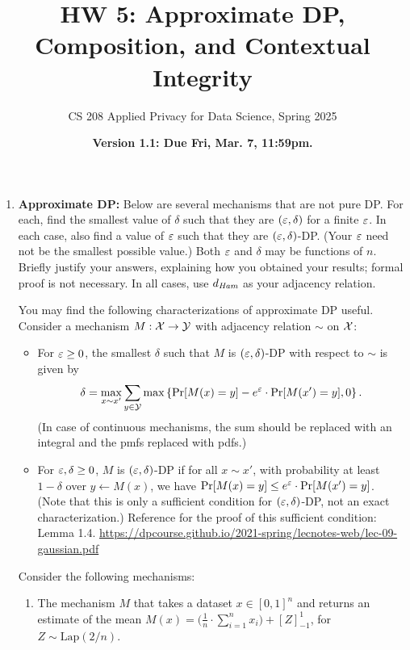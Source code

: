 \documentclass[11pt]{article}
\title{\vspace{-1.5cm} HW 5: Approximate DP, Composition, and Contextual Integrity}
\author{CS 208 Applied Privacy for Data Science, Spring 2025}
\date{\textbf{Version 1.1: Due Fri, Mar. 7, 11:59pm.}}
\begin{document}
\maketitle

\instructions

\begin{enumerate}[leftmargin=*]

\item \textbf{Approximate DP:}  
Below are several mechanisms that are not pure DP.  For each, find the smallest value of $\delta$ such that they are $(\varepsilon,\delta)$ for a finite $\varepsilon$.  In each case, also find a value of $\varepsilon$ such that they are $(\varepsilon,\delta)$-DP.  (Your $\varepsilon$ need not be the smallest possible value.)  Both $\varepsilon$ and $\delta$ may be functions of $n$.
Briefly justify your answers, explaining how you obtained your results; formal proof is not necessary.  In all cases, use $d_{\textit{Ham}}$ as your adjacency relation. 

You may find the following characterizations of approximate DP useful. Consider a mechanism $M : \mathcal{X}\rightarrow \mathcal{Y}$ with adjacency relation $\sim$ on $\mathcal{X}$:
\begin{itemize}
\item For $\varepsilon\geq 0$, the smallest $\delta$ such that $M$ is $(\varepsilon,\delta)$-DP with respect to $\sim$ is given by
$$\delta = \max_{x\sim x'} \sum_{y\in \mathcal{Y}} \max\left\{\Pr[M(x)=y]-e^\varepsilon\cdot \Pr[M(x')=y],0\right\}.$$
(In case of continuous mechanisms, the sum should be replaced with an integral and the pmfs replaced with pdfs.)

\item For $\varepsilon,\delta\geq 0$, $M$ is $(\varepsilon,\delta)$-DP if for all $x\sim x'$, with probability at least $1-\delta$ over $y\gets M(x)$, we have 
$\Pr[M(x)=y]\leq e^\varepsilon \cdot \Pr[M(x')=y]$.  (Note that this is only a sufficient condition for $(\varepsilon,\delta)$-DP, not an exact characterization.) Reference for the proof of this sufficient condition: Lemma 1.4. \url{https://dpcourse.github.io/2021-spring/lecnotes-web/lec-09-gaussian.pdf}
\end{itemize}


\enlargethispage{2\baselineskip}
Consider the following mechanisms:

\begin{enumerate} %
    \item  The mechanism $M$ that takes a dataset $x\in [0,1]^n$ and returns an estimate of the mean $M(x) = \Big(\frac{1}{n}\cdot \sum_{i=1}^n x_i\Big)+ [Z]^1_{-1}$, for $Z\sim \mathrm{Lap}(2/n)$.


\end{enumerate}
\end{enumerate}
\end{document}

